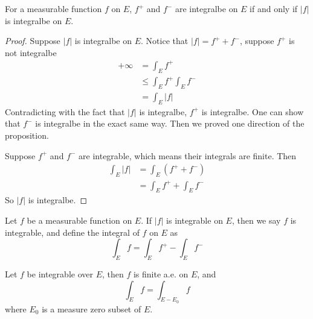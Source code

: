 \documentclass[lang=en, 12pt]{elegantbook}
\begin{document}
            \begin{proposition}
                 For a measurable function $f$ on $E$, $f^+$ and $f^-$ are integralbe on $E$ if and only if $|f|$ is integralbe on $E$. 
            \end{proposition}
            \begin{proof}
                Suppose $|f|$ is integralbe on $E$. Notice that $|f|= f^+ + f^-$, suppose $f^+$ is not integralbe 
                \begin{equation*}
                    \begin{aligned}
                        +\infty &= \int_E f^+ \\
                        &\leq \int_E f^+ \int_E f^-\\
                        &= \int_E |f|
                    \end{aligned}
                \end{equation*} 
            Contradicting with the fact that $|f|$ is integralbe, $f^+$ is integralbe. One can show that $f^-$ is integralbe in the exact
            same way. Then we proved one direction of the proposition.\par
                Suppose $f^+$ and $f^-$ are integrable, which means their integrals are finite. Then 
                \begin{equation*}
                    \begin{aligned}
                        \int_E |f| &= \int_E (f^+ +f^-)\\ 
                        &= \int_E f^+ + \int_E f^-
                    \end{aligned}
                \end{equation*}
            So $|f|$ is integralbe.
            \end{proof}
        \begin{definition}
            Let $f$ be a measurable function on $E$. If $|f|$ is integrable on $E$, then we say $f$ is integrable, and define the integral of $f$ on $E$ as 
            \begin{equation}
                \int_E f = \int_E f^+ - \int_E f^-
            \end{equation}
        \end{definition}
        \begin{proposition}
            Let $f$ be integrable over $E$, then $f$ is finite a.e. on $E$, and 
            \begin{equation}\label{GLIMeasureZeroSet}
                \int_E f = \int_{E-E_0} f
            \end{equation} 
            where $E_0$ is a measure zero subset of $E$.
        \end{proposition}
\end{document}
